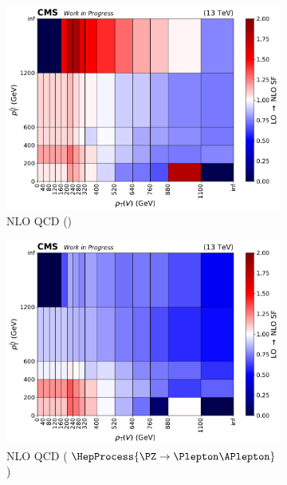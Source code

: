 \begin{figure}[htbp]
    \centering
    \begin{subfigure}[b]{0.32\textwidth}
        \includegraphics[width=\textwidth]{figures/nlo_k_factors/2D_wjets.pdf}
        \caption{NLO QCD (\PW)}
    \end{subfigure}
    \hfill
    \begin{subfigure}[b]{0.32\textwidth}
        \includegraphics[width=\textwidth]{figures/nlo_k_factors/2D_zll.pdf}
        \caption{NLO QCD ($\HepProcess{\PZ \to \Plepton\APlepton}$)}
    \end{subfigure}
    \hfill
    \begin{subfigure}[b]{0.32\textwidth}

\end{subfigure}
\end{figure}
